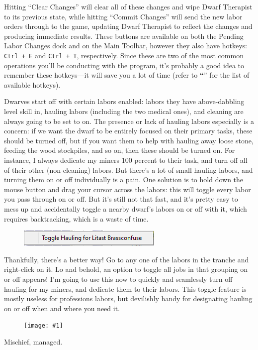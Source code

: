 \documentclass[]{article}
\newcommand{\jump}[1] {\textbf{``\nameref{sec:#1}}''}
\newcommand{\fullfigure}[1] {
\begin{figure}[h!]
\texttt{[image: \#1]}
\end{figure}
}
\newcommand{\fullfigurecaption}[1] {
\begin{center}
\vspace{-12pt}
#1
\end{center}
}
\begin{document}
\newpage
\noindent Hitting ``Clear Changes'' will clear all of these changes and wipe Dwarf Therapist to its
previous state, while hitting ``Commit Changes'' will send the new labor orders through to the game,
updating Dwarf Therapist to reflect the changes and producing immediate results. These buttons are
available on both the Pending Labor Changes dock and on the Main Toolbar, however they also have
hotkeys:
\texttt{Ctrl + E} and \texttt{Ctrl + T}, respectively. Since these are two of the most common operations
you'll be conducting with the program, it's probably a good idea to remember these hotkeys---it will save
you a lot of time (refer to \jump{Hotkeys} for the list of available hotkeys).

Dwarves start off with certain labors enabled: labors they have above-dabbling level skill in, hauling
labors (including the two medical ones), and cleaning are always going to be set to on. The presence or
lack of hauling labors especially is a concern: if we want the dwarf to be entirely focused on their
primary tasks, these should be turned off, but if you want them to help with hauling away loose stone,
feeding the wood stockpiles, and so on, then these should be turned on. For instance, I always dedicate
my miners 100 percent to their task, and turn off all of their other (non-cleaning) labors. But there's a
lot of small hauling labors, and turning them on or off individually is a pain.  One solution is to hold
down the mouse button and drag your cursor across the labors: this will toggle every labor you pass
through on or off. But it's still not that fast, and it's pretty easy to mess up and accidentally toggle
a nearby dwarf's labors on or off with it, which requires backtracking, which is a waste of time.

\begin{figure}
\vspace{-20pt}
  \begin{center}
    \includegraphics{Sec2Fig4}
  \end{center}
\vspace{-10pt}
\end{figure}
Thankfully, there's a better way! Go to any one of the labors in the tranche and right-click on it. Lo
and behold, an option to toggle all jobs in that grouping on or off appears! I'm going to use this now to
quickly and seamlessly turn off hauling for my miners, and dedicate them to their labors. This toggle
feature is mostly useless for professions labors, but devilishly handy for designating hauling on or off
when and where you need it.
\fullfigure{Sec2Fig5}
\fullfigurecaption{Mischief, managed.}
\end{document}

